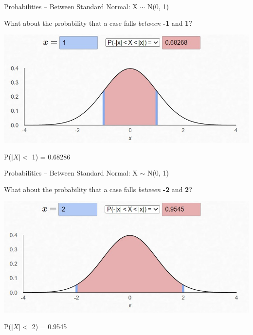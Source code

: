 \documentclass{beamer}
\begin{document}
\begin{frame}{Probabilities -- Between}
Standard Normal: X $\sim$ N(0, 1)

What about the probability that a case falls \textit{between} \textbf{-1} and \textbf{1}?
\begin{center}
    \includegraphics[scale=.7]{img/norm_prob6.jpg}
    
    P($|X| <$ 1) = 0.68286
\end{center}
\end{frame}

\begin{frame}{Probabilities -- Between}
Standard Normal: X $\sim$ N(0, 1)

What about the probability that a case falls \textit{between} \textbf{-2} and \textbf{2}?
\begin{center}
    \includegraphics[scale=.7]{img/norm_prob7.jpg}

    P($|X| <$ 2) = 0.9545
\end{center}
\end{frame}
\end{document}
